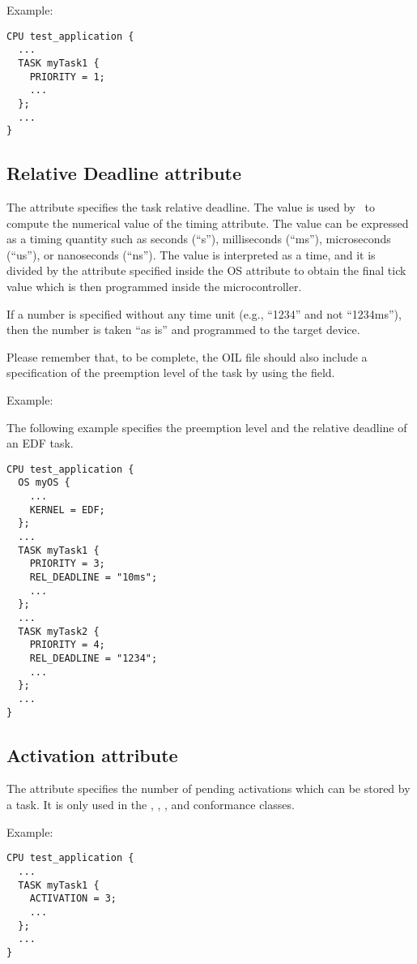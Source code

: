 Example:

\begin{lstlisting}
CPU test_application {
  ...
  TASK myTask1 {
    PRIORITY = 1;
    ...
  };
  ...
}
\end{lstlisting}

\subsection{Relative Deadline attribute}
The  attribute specifies the task relative deadline. The
value is used by \rtd\ to compute the numerical value of the timing
attribute. The value can be expressed as a timing quantity such as
seconds (``s''), milliseconds (``ms''), microseconds (``us''), or
nanoseconds (``ns''). The value is interpreted as a time, and it is
divided by the  attribute specified inside the OS
attribute  to obtain the final tick value which is
then programmed inside the microcontroller.

If a number is specified without any time unit (e.g., ``1234'' and not
``1234ms''), then the number is taken ``as is'' and programmed to
the target device.

Please remember that, to be complete, the OIL
file should also include a specification of the preemption level of
the task by using the  field.

Example:

The following example specifies the preemption level and the relative
deadline of an EDF task.

\begin{lstlisting}
CPU test_application {
  OS myOS {
    ...
    KERNEL = EDF;
  };
  ...
  TASK myTask1 {
    PRIORITY = 3;
    REL_DEADLINE = "10ms";
    ...
  };
  ...
  TASK myTask2 {
    PRIORITY = 4;
    REL_DEADLINE = "1234";
    ...
  };
  ...
}
\end{lstlisting}


\subsection{Activation attribute}
The  attribute specifies the number of pending
activations which can be stored by a task. It is only used in the
, , , and  conformance
classes.

Example:

\begin{lstlisting}
CPU test_application {
  ...
  TASK myTask1 {
    ACTIVATION = 3;
    ...
  };
  ...
}
\end{lstlisting}

